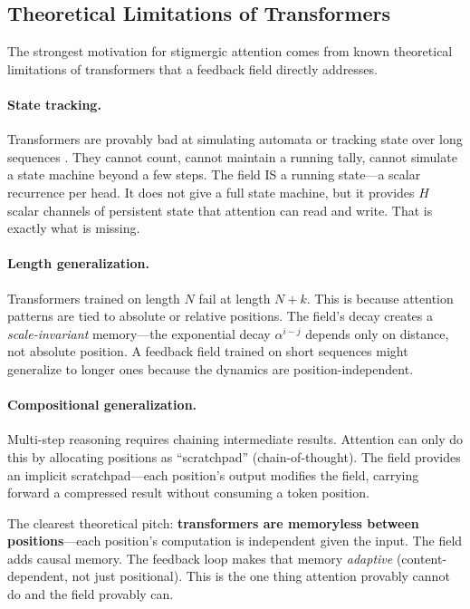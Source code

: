 \documentclass[11pt,a4paper]{article}
\newcommand{\retain}{\alpha}
\begin{document}
\subsection{Theoretical Limitations of Transformers}
\label{sec:limitations}

The strongest motivation for stigmergic attention comes from known
theoretical limitations of transformers that a feedback field directly
addresses.

\paragraph{State tracking.}
Transformers are provably bad at simulating automata or tracking
state over long sequences \cite{merrill2023transformers}. They cannot
count, cannot maintain a running tally, cannot simulate a state
machine beyond a few steps. The field IS a running state---a scalar
recurrence per head. It does not give a full state machine, but it
provides $H$ scalar channels of persistent state that attention can
read and write. That is exactly what is missing.

\paragraph{Length generalization.}
Transformers trained on length $N$ fail at length $N + k$. This is
because attention patterns are tied to absolute or relative positions.
The field's decay creates a \emph{scale-invariant} memory---the
exponential decay $\retain^{i-j}$ depends only on distance, not
absolute position. A feedback field trained on short sequences might
generalize to longer ones because the dynamics are
position-independent.

\paragraph{Compositional generalization.}
Multi-step reasoning requires chaining intermediate results. Attention
can only do this by allocating positions as ``scratchpad''
(chain-of-thought). The field provides an implicit scratchpad---each
position's output modifies the field, carrying forward a compressed
result without consuming a token position.

\medskip

The clearest theoretical pitch: \textbf{transformers are memoryless
between positions}---each position's computation is independent given
the input. The field adds causal memory. The feedback loop makes that
memory \emph{adaptive} (content-dependent, not just positional). This
is the one thing attention provably cannot do and the field provably
can.
\end{document}
